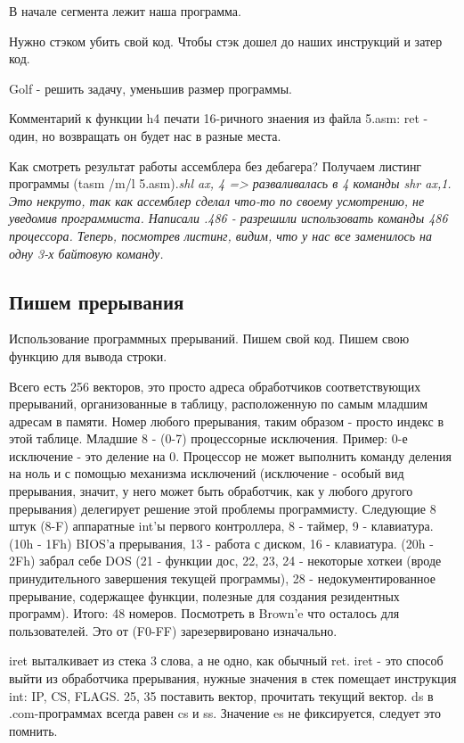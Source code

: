 В начале сегмента лежит наша программа.

\begin{hw}Нужно стэком убить свой код. Чтобы стэк дошел до наших инструкций и затер код.\end{hw}

Golf - решить задачу, уменьшив размер программы. 

Комментарий к функции h4 печати 16-ричного знаения из файла 5.asm: ret - один, но возвращать он будет нас в разные места.

Как смотреть результат работы ассемблера без дебагера? 	Получаем листинг программы (tasm /m/l 5.asm).\slshape shl ax, 4 \upshape => разваливалась в 4 команды \slshape shr ax,1\upshape. Это некруто, так как ассемблер сделал что-то по своему усмотрению, не уведомив программиста. Написали .486 - разрешили использовать команды 486 процессора. Теперь, посмотрев листинг, видим, что у нас все заменилось на одну 3-х байтовую команду.

\subsection{Пишем прерывания}
Использование программных прерываний. Пишем свой код.
Пишем свою функцию для вывода строки.

Всего есть 256 векторов, это просто адреса обработчиков соответствующих прерываний, организованные в таблицу, расположенную по самым младшим адресам в памяти. Номер любого прерывания, таким образом - просто индекс в этой таблице. Младшие 8 - (0-7) процессорные исключения. Пример: 0-е исключение - это деление на 0. Процессор не может выполнить команду деления на ноль и с помощью механизма исключений (исключение - особый вид прерывания, значит, у него может быть обработчик, как у любого другого прерывания) делегирует решение этой проблемы программисту. Следующие 8 штук (8-F) аппаратные int'ы первого контроллера, 8 - таймер, 9 - клавиатура. (10h - 1Fh) BIOS'а прерывания, 13 - работа с диском, 16 - клавиатура. (20h - 2Fh) забрал себе DOS (21 - функции дос, 22, 23, 24 - некоторые хоткеи (вроде принудительного завершения текущей программы), 28 - недокументированное прерывание, содержащее функции, полезные для создания резидентных программ). Итого: 48 номеров. Посмотреть в Brown'e что осталось для пользователей. Это от (F0-FF) зарезервировано изначально.

iret выталкивает из стека 3 слова, а не одно, как обычный ret. iret - это способ выйти из обработчика прерывания, нужные значения в стек помещает инструкция int: IP, CS, FLAGS. 25, 35 поставить вектор, прочитать текущий вектор.
ds в .com-программах всегда равен cs и ss. Значение es не фиксируется, следует это помнить.  


